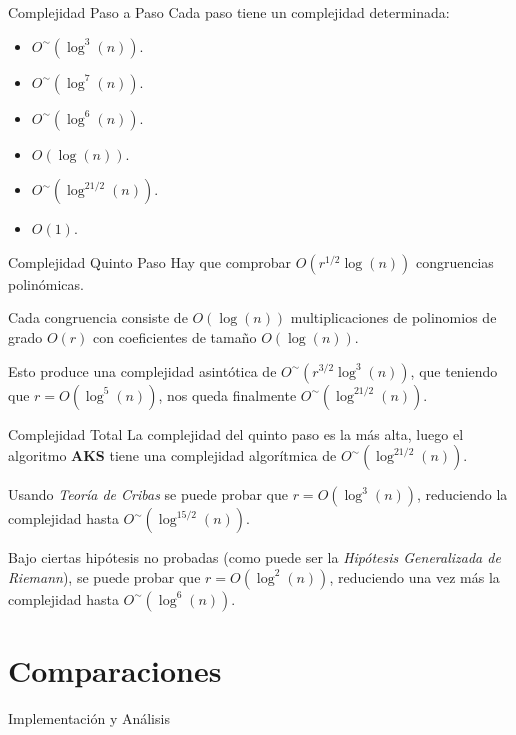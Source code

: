 \documentclass{beamer}
\begin{document}
\begin{frame}{Complejidad Paso a Paso}
	\onslide<1->Cada paso tiene un complejidad determinada:\break
	
	\begin{itemize}
		\item $O^\sim(\log^3(n))$.
		\item $O^\sim(\log^7(n))$.
		\item $O^\sim(\log^6(n))$.
		\item $O(\log(n))$.
		\item $O^\sim(\log^{21/2}(n))$.
		\item $O(1)$.
	\end{itemize}
\end{frame}

\begin{frame}{Complejidad Quinto Paso}
	\onslide<1->Hay que comprobar $O(r^{1/2}\log(n))$ congruencias polinómicas.\break
	
	Cada congruencia consiste de $O(\log(n))$ multiplicaciones de polinomios de grado $O(r)$ con coeficientes de tamaño $O(\log(n))$.\break
	
	Esto produce una complejidad asintótica de $O^\sim(r^{3/2}\log^3(n))$, que teniendo que $r = O(\log^5(n))$, nos queda finalmente $O^\sim(\log^{21/2}(n))$.
\end{frame}

\begin{frame}{Complejidad Total}
	\onslide<1->La complejidad del quinto paso es la más alta, luego el algoritmo \textbf{AKS} tiene una complejidad algorítmica de $O^\sim(\log^{21/2}(n))$.\break
	
	Usando \textit{Teoría de Cribas} se puede probar que $r = O(\log^3(n))$, reduciendo la complejidad hasta $O^\sim(\log^{15/2}(n))$.\break
	
	Bajo ciertas hipótesis no probadas (como puede ser la \textit{Hipótesis Generalizada de Riemann}), se puede probar que $r = O(\log^2(n))$, reduciendo una vez más la complejidad hasta $O^\sim(\log^6(n))$.
\end{frame}

\section{Comparaciones}

\begin{frame}
	\centering
	\begin{Huge}
		Implementación y Análisis
	\end{Huge}
\end{frame}
\end{document}
